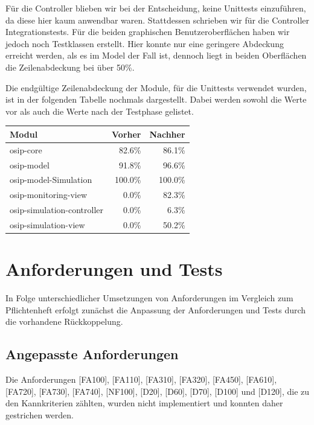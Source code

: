 \documentclass[parskip=full]{scrartcl}
\begin{document}
Für die Controller blieben wir bei der Entscheidung, keine Unittests einzuführen, da diese hier kaum anwendbar waren. Stattdessen schrieben wir für die Controller
Integrationstests. Für die beiden graphischen Benutzeroberflächen haben wir jedoch noch Testklassen
erstellt. Hier konnte nur eine geringere Abdeckung erreicht werden, als es im Model der Fall ist, dennoch liegt in beiden Oberflächen die Zeilenabdeckung bei
über 50\%.

Die endgültige Zeilenabdeckung der Module, für die Unittests verwendet wurden, ist in der folgenden Tabelle nochmals dargestellt. Dabei werden sowohl die
Werte vor als auch die Werte nach der Testphase gelistet.

\begin{tabular} {| l || r | r |}
  \hline
  Modul				& Vorher	& Nachher	\\
  \hline \hline
  osip-core			& 82.6\%	& 86.1\%	\\
  osip-model			& 91.8\%	& 96.6\%	\\
  osip-model-Simulation		& 100.0\%	& 100.0\%	\\
  osip-monitoring-view		& 0.0\%		& 82.3\%	\\
  osip-simulation-controller	& 0.0\%		& 6.3\%		\\
  osip-simulation-view		& 0.0\%		& 50.2\%	\\
  \hline
\end{tabular}

\section{Anforderungen und Tests}
In Folge unterschiedlicher Umsetzungen von Anforderungen im Vergleich zum Pflichtenheft erfolgt zunächst die Anpassung der Anforderungen und Tests durch die vorhandene Rückkoppelung.

\subsection{Angepasste Anforderungen}
Die Anforderungen [FA100], [FA110], [FA310], [FA320], [FA450], [FA610], [FA720], [FA730], [FA740], [NF100], [D20], [D60], [D70], [D100] und [D120], die zu den Kannkriterien zählten, wurden nicht implementiert und konnten daher gestrichen werden.
\end{document}
